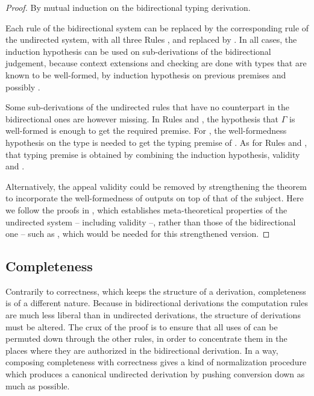 \begin{proof}
  By mutual induction on the bidirectional typing derivation.

  Each rule of the bidirectional system can be replaced by the corresponding rule of the
  undirected system, with all three Rules ,  and  replaced by
  . In all cases, the induction hypothesis can be used on sub-derivations of the bidirectional judgement, because context extensions and checking are
  done with types that are known to be well-formed,
  by induction hypothesis on previous premises and possibly .%

  Some sub-derivations of the undirected rules that have no counterpart
  in the bidirectional ones are however missing.
  In Rules  and ,
  the hypothesis that $\Gamma$ is well-formed is enough to get the required premise.
  For ,
  the well-formedness hypothesis on the type is needed to get the typing premise of
  .
  As for Rules  and ,
  that typing premise is obtained by combining the induction hypothesis,
  validity and .

  Alternatively, the appeal validity could be removed by
  strengthening the theorem to incorporate the well-formedness of outputs on top of that of
  the subject. Here we follow the proofs in , which establishes
  meta-theoretical properties of the undirected system – including validity –,
  rather than those of the bidirectional one – such as ,
  which would be needed for this strengthened version.

\end{proof}

\subsection{Completeness}

Contrarily to correctness, which keeps the structure of a derivation,
completeness is of a different nature.
Because in bidirectional derivations the computation rules are much less liberal than in
undirected derivations, the structure of derivations must be altered.
The crux of the proof is to ensure that all uses of 
can be permuted down through the other rules,
in order to concentrate them in the places where they are authorized in the bidirectional
derivation.
In a way, composing completeness with correctness gives a kind of normalization procedure
which produces a canonical undirected derivation by pushing conversion
down as much as possible.

